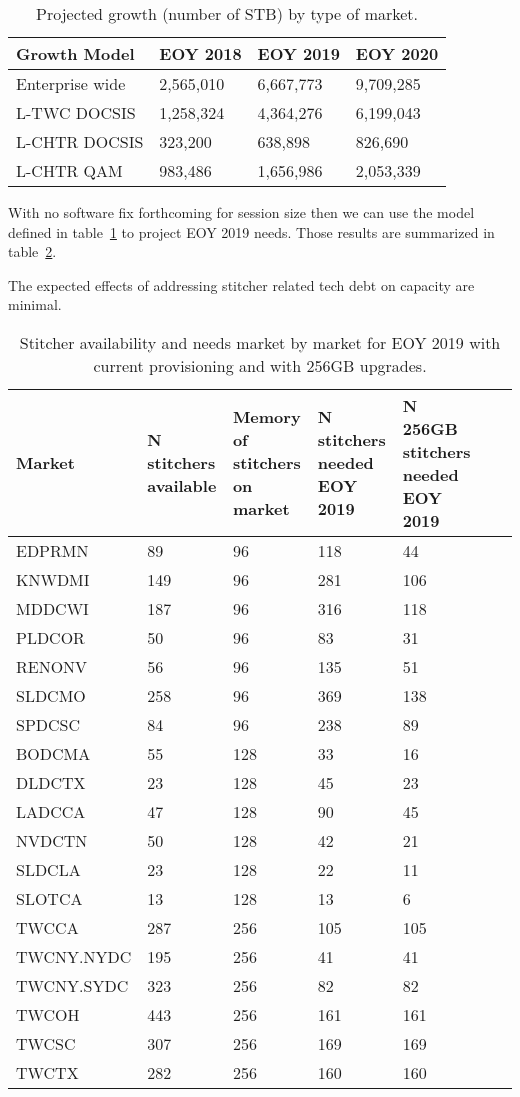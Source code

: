 \documentclass{article}
\begin{document}
\begin{table}[H]
\begin{tabular}{|l|l|l|l|} 
\hline Growth Model & EOY 2018 & EOY 2019 & EOY 2020 \\
\hline Enterprise wide & 2,565,010 & 6,667,773 & 9,709,285 \\
\hline L-TWC DOCSIS & 1,258,324 & 4,364,276 & 6,199,043 \\
\hline L-CHTR DOCSIS & 323,200 & 638,898 & 826,690 \\
\hline L-CHTR QAM & 983,486 & 1,656,986 & 2,053,339\\
\hline 
\end{tabular}
\caption{\label{TABLE-GrowthModel}Projected growth (number of STB) by type of market.}
\end{table}

With no software fix forthcoming for session size then we can use the model defined in table~\ref{TABLE-GrowthModel} to project EOY 2019 needs. Those results are summarized in table~\ref{TABLE-StitchersNeeded2019}. 

The expected effects of addressing stitcher related tech debt on capacity are minimal. 

\begin{table}
\begin{tabular}{|l|p{17mm}|p{17mm}|p{17mm}|p{17mm}|p{17mm}|p{17mm}|} 
\hline Market & N stitchers available & Memory of stitchers on market & N stitchers needed EOY 2019 & N 256GB stitchers needed EOY 2019 \\
\hline EDPRMN & 89 & 96 & 118 & 44 \\
\hline KNWDMI & 149 & 96 & 281 & 106 \\
\hline MDDCWI & 187 & 96 & 316 & 118 \\
\hline PLDCOR & 50 & 96 & 83 & 31 \\
\hline RENONV & 56 & 96 & 135 & 51 \\
\hline SLDCMO & 258 & 96 & 369 & 138 \\
\hline SPDCSC & 84 & 96 & 238 & 89 \\
\hline BODCMA & 55 & 128 & 33 & 16 \\
\hline DLDCTX & 23 & 128 & 45 & 23 \\
\hline LADCCA & 47 & 128 & 90 & 45 \\
\hline NVDCTN & 50 & 128 & 42 & 21 \\
\hline SLDCLA & 23 & 128 & 22 & 11 \\
\hline SLOTCA & 13 & 128 & 13 & 6 \\
\hline TWCCA & 287 & 256 & 105 & 105 \\
\hline TWCNY.NYDC & 195 & 256 & 41 & 41 \\
\hline TWCNY.SYDC & 323 & 256 & 82 & 82 \\
\hline TWCOH & 443 & 256 & 161 & 161 \\
\hline TWCSC & 307 & 256 & 169 & 169 \\
\hline TWCTX & 282 & 256 & 160 & 160 \\
\hline 
\end{tabular}
\caption{\label{TABLE-StitchersNeeded2019}Stitcher availability and needs market by market for EOY 2019 with current provisioning and with 256GB upgrades.} 
\end{table}
\end{document}
